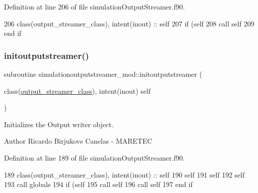 Definition at line 206 of file simulation\+Output\+Streamer.\+f90.


\begin{DoxyCode}
206     \textcolor{keywordtype}{class}(output\_streamer\_class), \textcolor{keywordtype}{intent(inout)} :: self
207     \textcolor{keywordflow}{if} (self%
208         \textcolor{keyword}{call }self%
209 \textcolor{keywordflow}{    end if}
\end{DoxyCode}
\mbox{\label{namespacesimulationoutputstreamer__mod_a9ab3e2101fbed18ea896729f7201e1aa}} 
\subsubsection{\texorpdfstring{initoutputstreamer()}{initoutputstreamer()}}
{\footnotesize\ttfamily subroutine simulationoutputstreamer\+\_\+mod\+::initoutputstreamer (\begin{DoxyParamCaption}\item[{class(\mbox{\hyperlink{structsimulationoutputstreamer__mod_1_1output__streamer__class}{output\+\_\+streamer\+\_\+class}}), intent(inout)}]{self }\end{DoxyParamCaption})\hspace{0.3cm}{\ttfamily [private]}}



Initializes the Output writer object. 

\begin{DoxyAuthor}{Author}
Ricardo Birjukovs Canelas -\/ M\+A\+R\+E\+T\+EC 
\end{DoxyAuthor}


Definition at line 189 of file simulation\+Output\+Streamer.\+f90.


\begin{DoxyCode}
189     \textcolor{keywordtype}{class}(output\_streamer\_class), \textcolor{keywordtype}{intent(inout)} :: self
190     self%
191     self%
192     self%
193     \textcolor{keyword}{call }globals%
194     \textcolor{keywordflow}{if} (self%
195         \textcolor{keyword}{call }self%
196         \textcolor{keyword}{call }self%
197 \textcolor{keywordflow}{    end if}
\end{DoxyCode}
\mbox{\label{namespacesimulationoutputstreamer__mod_a2c660b4331c576befebcf037b82b8d7a}} 
